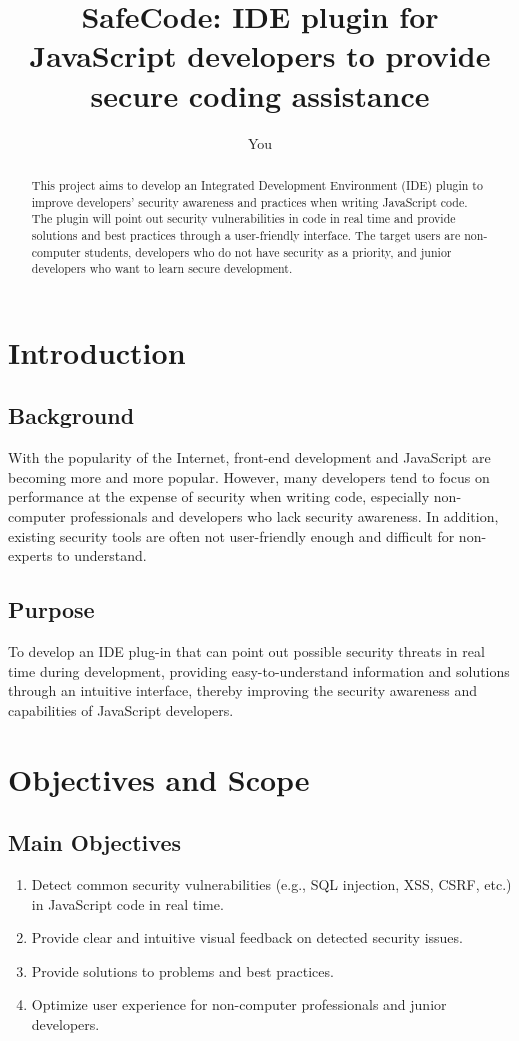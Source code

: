 \documentclass{article}
\title{SafeCode: IDE plugin for JavaScript developers to provide secure coding assistance}
\author{You}
\begin{document}
\maketitle

\begin{abstract}
This project aims to develop an Integrated Development Environment (IDE) plugin to improve developers' security awareness and practices when writing JavaScript code. The plugin will point out security vulnerabilities in code in real time and provide solutions and best practices through a user-friendly interface. The target users are non-computer students, developers who do not have security as a priority, and junior developers who want to learn secure development.
\end{abstract}

\section{Introduction}

\subsection{Background}
With the popularity of the Internet, front-end development and JavaScript are becoming more and more popular. However, many developers tend to focus on performance at the expense of security when writing code, especially non-computer professionals and developers who lack security awareness. In addition, existing security tools are often not user-friendly enough and difficult for non-experts to understand.

\subsection{Purpose}
To develop an IDE plug-in that can point out possible security threats in real time during development, providing easy-to-understand information and solutions through an intuitive interface, thereby improving the security awareness and capabilities of JavaScript developers.

\section{Objectives and Scope}

\subsection{Main Objectives}
\begin{enumerate}
    \item Detect common security vulnerabilities (e.g., SQL injection, XSS, CSRF, etc.) in JavaScript code in real time.
    \item Provide clear and intuitive visual feedback on detected security issues.
    \item Provide solutions to problems and best practices.
    \item Optimize user experience for non-computer professionals and junior developers.
\end{enumerate}
\end{document}
